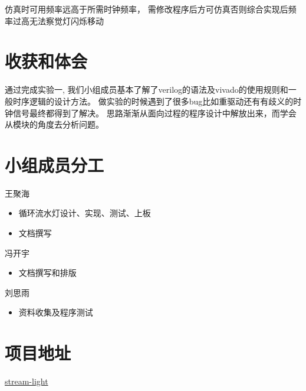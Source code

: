 \documentclass[UTF8]{article}
\begin{document}
仿真时可用频率远高于所需时钟频率，
需修改程序后方可仿真否则综合实现后频率过高无法察觉灯闪烁移动

\section{收获和体会}

通过完成实验一,
 我们小组成员基本了解了verilog的语法及vivado的使用规则和一般时序逻辑的设计方法。
 做实验的时候遇到了很多bug比如重驱动还有有歧义的时钟信号最终都得到了解决。
  思路渐渐从面向过程的程序设计中解放出来，而学会从模块的角度去分析问题。  

\section{小组成员分工}

王聚海
\begin{itemize}
    \item 循环流水灯设计、实现、测试、上板
    \item 文档撰写
\end{itemize}

冯开宇
\begin{itemize}
    \item 文档撰写和排版
\end{itemize}

刘思雨
\begin{itemize}
    \item 资料收集及程序测试
\end{itemize}



\section{项目地址}

\href{https://github.com/bit-logic-computer-design-2019/stream-light}{stream-light}
\end{document}
